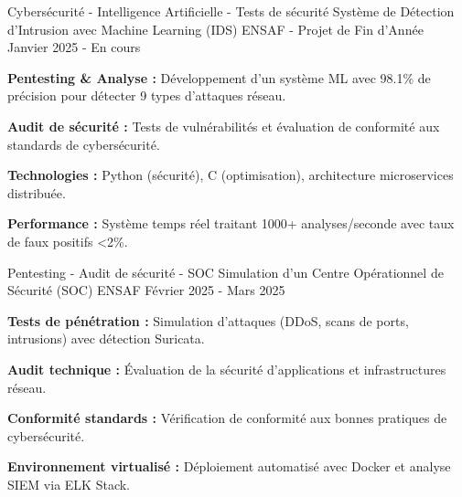 
\begin{cventries}

    \cventry
    {Cybersécurité - Intelligence Artificielle - Tests de sécurité}
    {Système de Détection d'Intrusion avec Machine Learning (IDS)} %
    {ENSAF - Projet de Fin d'Année} %
    {Janvier 2025 - En cours} %
    {
        \begin{cvitems} %
            \item {
                        \textbf{Pentesting \& Analyse :}
                        Développement d'un système ML avec 98.1\% de précision pour détecter 9 types d'attaques réseau.}
            \item {
                        \textbf{Audit de sécurité :}
                        Tests de vulnérabilités et évaluation de conformité aux standards de cybersécurité.}
            \item {
                        \textbf{Technologies :}
                        Python (sécurité), C (optimisation), architecture microservices distribuée.}
            \item {
                        \textbf{Performance :}
                        Système temps réel traitant 1000+ analyses/seconde avec taux de faux positifs <2\%.}
        \end{cvitems}
    }

    \cventry
    {Pentesting - Audit de sécurité - SOC}
    {Simulation d'un Centre Opérationnel de Sécurité (SOC)} %
    {ENSAF} %
    {Février 2025 - Mars 2025} %
    {
        \begin{cvitems} %
            \item {
                        \textbf{Tests de pénétration :}
                        Simulation d'attaques (DDoS, scans de ports, intrusions) avec détection Suricata.}
            \item {
                        \textbf{Audit technique :}
                        Évaluation de la sécurité d'applications et infrastructures réseau.}
            \item {
                        \textbf{Conformité standards :}
                        Vérification de conformité aux bonnes pratiques de cybersécurité.}
            \item {
                        \textbf{Environnement virtualisé :}
                        Déploiement automatisé avec Docker et analyse SIEM via ELK Stack.}
        \end{cvitems}
    }

\end{cventries}